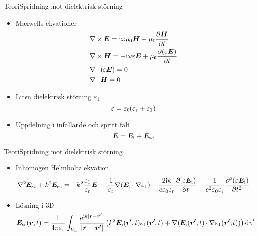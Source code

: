 \documentclass[11pt, final]{beamer}
\begin{document}
	\begin{frame}{Teori}{Spridning mot dielektrisk störning}
		\begin{itemize}
			\item Maxwells ekvationer
			\begin{align*}
				&\nabla \times \bm{E} = \mathrm{i}\omega \mu_0 \bm{H} - \mu_0 \frac{\partial \bm{H}}{\partial t} \\
				&\nabla \times \bm{H} = -\mathrm{i}\omega \varepsilon \bm{E} + \mu_0 \frac{\partial (\varepsilon \bm{E})}{\partial t} \\
				&\nabla \cdot (\varepsilon \bm{E}) = 0 \\
				&\nabla \cdot \bm{H} = 0
			\end{align*}
			\pause
			\item Liten dielektrisk störning $\varepsilon_1$
			\begin{equation*}
				\varepsilon = \varepsilon_0(\varepsilon_{\mathrm{r}} + \varepsilon_1)
			\end{equation*}
			\item Uppdelning i infallande och spritt fält
			\begin{equation*}
				\bm{E} = \bm{E}_{\mathrm{i}} + \bm{E}_{\mathrm{sc}}
			\end{equation*}
		\end{itemize}
	\end{frame}
	
	\begin{frame}{Teori}{Spridning mot dielektrisk störning}
		\begin{itemize}
			\item Inhomogen Helmholtz ekvation
			\footnotesize
			\begin{equation*}
				\nabla^2\bm{E}_{\mathrm{sc}} + k^2 \bm{E}_{\mathrm{sc}} =	-k^2 \frac{\varepsilon_1}{\varepsilon_{\mathrm{r}}} \bm{E}_{\mathrm{i}} -\frac{1}{\varepsilon_{\mathrm{r}}}\nabla(\bm{E}_{\mathrm{i}} \cdot \nabla \varepsilon_1) - \frac{2\mathrm{i} k}{c\varepsilon_0\varepsilon_{\mathrm{r}}} \frac{\partial (\varepsilon \bm{E}_{\mathrm{i}})}{\partial t} + \frac{1}{c^2 \varepsilon_0 \varepsilon_{\mathrm{r}}} \frac{\partial^2 (\varepsilon \bm{E}_{\mathrm{i}})}{\partial t^2}
			\end{equation*}
			\pause
			\normalsize
			\item Lösning i 3D
			\footnotesize
			\begin{equation*}
				\bm{E}_{\mathrm{sc}}(\bm{r},t) = \frac{1}{4\pi\varepsilon_{\mathrm{r}}} \int_{V_{\mathrm{sc}}} \frac{\mathrm{e}^{\mathrm{i} k |\bm{r}-\bm{r'}| }}{ |\bm{r}-\bm{r'}|} \left( k^2 \bm{E}_{\mathrm{i}} (\bm{r'},t) \varepsilon_1 (\bm{r'},t) + \nabla (\bm{E}_{\mathrm{i}} (\bm{r'},t) \cdot \nabla \varepsilon_1 (\bm{r'},t)) \right) \mathrm{d}v'
			\end{equation*}
		\end{itemize}
	\end{frame}
\end{document}

